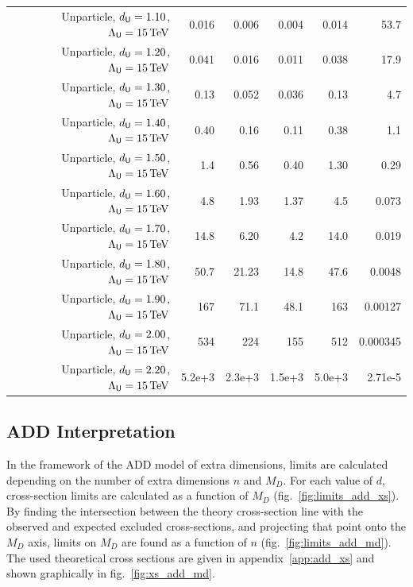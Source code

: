 \begin{table}[hbtp]
\begin{center}
{\begin{tabular}{rrrrrr}
Unparticle, $d_{\textsf{U}}=1.10$, $\Lambda_{\textsf{U}}=15\,\text{Te\hspace{-.08em}V}$ &   0.016 &    0.006 &    0.004 &    0.014 & 53.7 \\
Unparticle, $d_{\textsf{U}}=1.20$, $\Lambda_{\textsf{U}}=15\,\text{Te\hspace{-.08em}V}$ &   0.041 &    0.016 &    0.011 &    0.038 & 17.9 \\
Unparticle, $d_{\textsf{U}}=1.30$, $\Lambda_{\textsf{U}}=15\,\text{Te\hspace{-.08em}V}$ &    0.13 &    0.052 &    0.036 &    0.13  &  4.7 \\
Unparticle, $d_{\textsf{U}}=1.40$, $\Lambda_{\textsf{U}}=15\,\text{Te\hspace{-.08em}V}$ &    0.40 &     0.16 &     0.11 &    0.38  &  1.1 \\
Unparticle, $d_{\textsf{U}}=1.50$, $\Lambda_{\textsf{U}}=15\,\text{Te\hspace{-.08em}V}$ &     1.4 &     0.56 &     0.40 &    1.30  &  0.29 \\
Unparticle, $d_{\textsf{U}}=1.60$, $\Lambda_{\textsf{U}}=15\,\text{Te\hspace{-.08em}V}$ &     4.8 &     1.93 &     1.37 &    4.5   &  0.073 \\
Unparticle, $d_{\textsf{U}}=1.70$, $\Lambda_{\textsf{U}}=15\,\text{Te\hspace{-.08em}V}$ &    14.8 &     6.20 &      4.2 &   14.0   &  0.019 \\
Unparticle, $d_{\textsf{U}}=1.80$, $\Lambda_{\textsf{U}}=15\,\text{Te\hspace{-.08em}V}$ &    50.7 &    21.23 &     14.8 &   47.6   &  0.0048 \\
Unparticle, $d_{\textsf{U}}=1.90$, $\Lambda_{\textsf{U}}=15\,\text{Te\hspace{-.08em}V}$ &     167 &     71.1 &     48.1 &  163     &  0.00127 \\
Unparticle, $d_{\textsf{U}}=2.00$, $\Lambda_{\textsf{U}}=15\,\text{Te\hspace{-.08em}V}$ &     534 &      224 &      155 &  512     &  0.000345 \\
Unparticle, $d_{\textsf{U}}=2.20$, $\Lambda_{\textsf{U}}=15\,\text{Te\hspace{-.08em}V}$ &  5.2e+3 &   2.3e+3 &   1.5e+3 & 5.0e+3   &  2.71e-5 \\\hline
  \end{tabular}
}
  \end{center}
\end{table}



\clearpage

 \subsection{ADD Interpretation}
In the framework of the ADD model of extra dimensions, limits are calculated depending on the number of extra dimensions $n$ and $M_{D}$.
For each value of $d$, cross-section limits are calculated as a function of $M_{D}$ (fig.~\ref{fig:limits_add_xs}).
By finding the intersection between the theory cross-section line with the observed and expected excluded cross-sections,
and projecting that point onto the $M_{D}$ axis, limits on $M_{D}$ are found as a function of $n$ (fig.~\ref{fig:limits_add_md}).
The used theoretical cross sections are given in appendix~\ref{app:add_xs} and shown graphically in fig.~\ref{fig:xs_add_md}.

